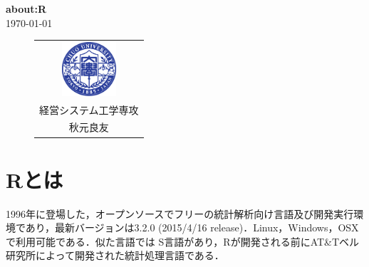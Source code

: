 \documentclass[a4paper,10pt,fleqn]{jarticle}
\begin{document}
\thispagestyle{empty}
\begin{center}
\vspace{3em}
{\bf \Huge{about:R}}
\vspace{1em}\\
\today
\vspace{1.2em}
\end{center}
\begin{indentation}{2.5cm}{2.5cm}
\begin{screen}
\tableofcontents
\end{screen}
\end{indentation}
\vspace{5em}
\begin{figure}[H]
  \begin{center}
    \begin{tabular}{c}
      \begin{minipage}{0.16\hsize}
        \begin{center}
          \includegraphics[width=2cm]{img/chuo.eps}
        \end{center}
      \end{minipage}
      \begin{minipage}{0.29\hsize}
        \begin{center}
          {\bf \large{中央大学理工学研究科\\経営システム工学専攻\\
          \vspace{0.5em}
          秋元良友}}
        \end{center}
      \end{minipage}
    \end{tabular}
  \end{center}
\end{figure}
\newpage
{}
\section{Rとは}
1996年に登場した，オープンソースでフリーの統計解析向け言語及び開発実行環境であり，最新バージョンは3.2.0 (2015/4/16 release)．Linux，Windows，OSX で利用可能である．似た言語では S言語があり，Rが開発される前にAT\&Tベル研究所によって開発された統計処理言語である．
\end{document}
